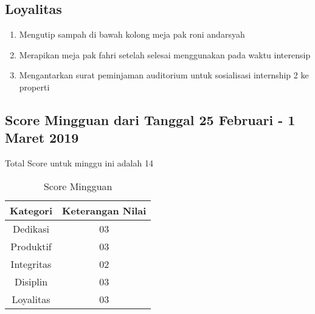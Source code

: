 \subsection{Loyalitas}
\begin{enumerate}
\item Mengutip sampah di bawah kolong meja pak roni andarsyah
\item Merapikan meja pak fahri setelah selesai menggunakan pada waktu interensip
\item Mengantarkan surat peminjaman auditorium untuk sosialisasi internship 2 ke properti
\end{enumerate}


\subsection{Score Mingguan dari Tanggal 25 Februari - 1 Maret 2019}
Total Score untuk minggu ini adalah 14

\begin{table}[h]
\caption{Score Mingguan}
\centering
\begin{tabular}{|c|c|}
\hline
\textbf{Kategori}&\textbf{Keterangan Nilai}\\
\hline
Dedikasi&03\\
\hline
Produktif&03\\
\hline
Integritas&02\\
\hline
Disiplin&03\\
\hline
Loyalitas&03\\
\hline
\end{tabular}
\label{table:score mingguan}
\end{table}